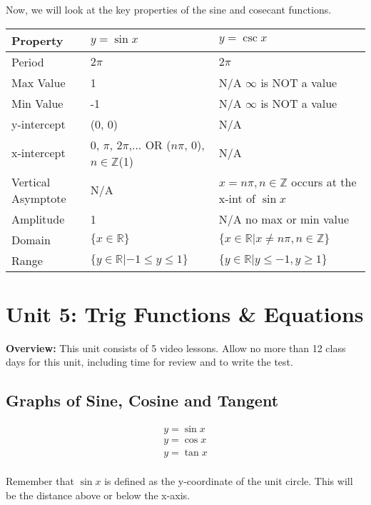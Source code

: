 \documentclass{article}
\begin{document}
Now, we will look at the key properties of the sine and cosecant functions.

\begin{tabular}{ |p{2cm}||p{5cm}|p{5cm}|  }
 \hline
 Property & $y = \sin x$ & $y = \csc x$\\
 \hline
 Period   & $2\pi$    & $2\pi$ \\
 \hline
 Max Value & 1 & N/A \textcolor{notecolor}{$\infty$ is NOT a value}\\
 \hline
 Min Value & -1 & N/A \textcolor{notecolor}{$\infty$ is NOT a value}\\
 \hline
 y-intercept & (0, 0) & N/A \\
 \hline
 x-intercept & 0, $\pi$, $2\pi$,... OR ($n\pi$, 0), $n\in \mathbb{Z}$(1)  & N/A\\
 \hline
 Vertical Asymptote & N/A & $x = n\pi, n\in \mathbb{Z}$ \textcolor{notecolor}{occurs at the x-int of $\sin x$}\\
 \hline
 Amplitude & 1 & N/A \textcolor{notecolor}{no max or min value}\\
 \hline
 Domain & $\{x\in \mathbb{R}\}$ & $\{x\in \mathbb{R}|x \neq n\pi, n\in \mathbb{Z} \}$\\
 \hline
 Range & $\{y\in \mathbb{R}|-1\leq y \leq 1\}$ & $\{y\in \mathbb{R}|y\leq -1, y \geq 1\}$\\
 \hline
\end{tabular}

\vspace{2em}

\section{Unit 5: Trig Functions \& Equations}
\textbf{Overview:} This unit consists of 5 video lessons. Allow no more than 12 class days for this unit, including time for review and to write the test.

\subsection{Graphs of Sine, Cosine and Tangent}
\[
\begin{array}{c}
y = \sin x \\
y = \cos x \\
y = \tan x \\
\end{array}
\]

\noindent Remember that \(\sin x\) is defined as the y-coordinate of the unit circle. This will be the distance above or below the x-axis.
\end{document}
